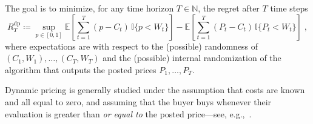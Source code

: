 \documentclass[final,12pt]{colt2025}
\newcommand{\E}{\mathbb{E}}
\newcommand{\N}{\mathbb{N}}
\newcommand{\lsb}[1]{\left[#1\right]}
\newcommand{\one}[1]{\mathbb{I}\{#1\}}
\newcommand{\ceq}{\coloneqq}
\newcommand{\Rdp}{R^{\mathrm{dp}}}
\newcommand{\nC}{C}
\newcommand{\nW}{W}
\newcommand{\nY}{P}
\newcommand{\ny}{p}
\begin{document}
The goal is to minimize, for any time horizon $T\in\N$, the regret after $T$ time steps
\[
    \Rdp_T
\ceq
    \sup_{\ny \in [0,1] } 
    \E\lsb{ \sum_{t=1}^T (\ny - \nC_t) \, \one{ \ny < \nW_t } }
    -
    \E\lsb{ \sum_{t=1}^T ( \nY_t - \nC_t) \, \one{ \nY_t < \nW_t } } \;,
\]
where expectations are with respect to the (possible) randomness of $( \nC_1,  \nW_1), \dots, ( \nC_T,  \nW_T)$ and the (possible) internal randomization of the algorithm that outputs the posted prices $ \nY_1, \dots,  \nY_T$.

Dynamic pricing is generally studied under the assumption that costs are known and all equal to zero, and assuming that the buyer buys whenever their evaluation is greater than \emph{or equal to} the posted price---see, e.g.,~\citep{kleinberg2003value,cesa2019dynamic,leme2021learning,luo2024distribution}. 
\end{document}
